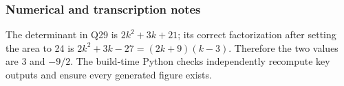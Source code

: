 \subsubsection*{Numerical and transcription notes}
The determinant in Q29 is $2k^2+3k+21$; its correct factorization after setting the area to 24 is $2k^2+3k-27=(2k+9)(k-3)$. Therefore the two values are $3$ and $-9/2$. The build-time Python checks independently recompute key outputs and ensure every generated figure exists.
